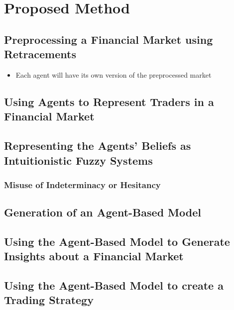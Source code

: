 \chapter{Proposed Method}
\label{chapter:proposed-method}

\section{Preprocessing a Financial Market using Retracements}
\label{section:preprocessing-a-financial-market-using-retracements}

\begin{itemize}
\item Each agent will have its own version of the preprocessed market
\end{itemize}

\section{Using Agents to Represent Traders in a Financial Market}
\label{section:using-agents-to-represent-traders-in-a-financial-market}

\section{Representing the Agents' Beliefs as Intuitionistic Fuzzy Systems}
\label{section:representing-the-agents-beliefs-as-intuitionistic-fuzzy-systems}

\subsection{Misuse of Indeterminacy or Hesitancy}
\label{subsection:misuse-of-indeterminacy-or-hesitancy}

\section{Generation of an Agent-Based Model}
\label{section:generation-of-an-agent-based-model}

\section{Using the Agent-Based Model to Generate Insights about a Financial Market}
\label{section:using-the-agent-based-model-to-generate-insights-about-a-financial-market}

\section{Using the Agent-Based Model to create a Trading Strategy}
\label{section:using-the-agent-based-model-to-create-a-trading-strategy}